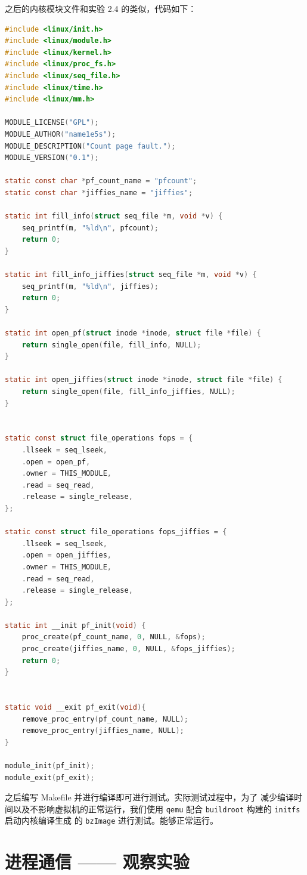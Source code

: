 \documentclass[blue,normal,cn]{elegantnote}
\newcommand{\code}[1]{\colorbox{light-gray}{\texttt{#1}}}
\begin{document}
之后的内核模块文件和实验 2.4 的类似，代码如下：
\begin{lstlisting}[language=C]
#include <linux/init.h>
#include <linux/module.h>
#include <linux/kernel.h>
#include <linux/proc_fs.h>
#include <linux/seq_file.h>
#include <linux/time.h>
#include <linux/mm.h>
 
MODULE_LICENSE("GPL");
MODULE_AUTHOR("name1e5s");
MODULE_DESCRIPTION("Count page fault.");
MODULE_VERSION("0.1");

static const char *pf_count_name = "pfcount";
static const char *jiffies_name = "jiffies";

static int fill_info(struct seq_file *m, void *v) {
    seq_printf(m, "%ld\n", pfcount);
	return 0;
}

static int fill_info_jiffies(struct seq_file *m, void *v) {
    seq_printf(m, "%ld\n", jiffies);
	return 0;
}

static int open_pf(struct inode *inode, struct file *file) {
	return single_open(file, fill_info, NULL);
}

static int open_jiffies(struct inode *inode, struct file *file) {
	return single_open(file, fill_info_jiffies, NULL);
}


static const struct file_operations fops = {
	.llseek = seq_lseek,
	.open = open_pf,
	.owner = THIS_MODULE,
	.read = seq_read,
	.release = single_release,
};

static const struct file_operations fops_jiffies = {
	.llseek = seq_lseek,
	.open = open_jiffies,
	.owner = THIS_MODULE,
	.read = seq_read,
	.release = single_release,
};

static int __init pf_init(void) {
    proc_create(pf_count_name, 0, NULL, &fops);
    proc_create(jiffies_name, 0, NULL, &fops_jiffies);
    return 0;
}


static void __exit pf_exit(void){
    remove_proc_entry(pf_count_name, NULL);
    remove_proc_entry(jiffies_name, NULL);
}

module_init(pf_init);
module_exit(pf_exit);
\end{lstlisting}

之后编写 Makefile 并进行编译即可进行测试。实际测试过程中，为了
减少编译时间以及不影响虚拟机的正常运行，我们使用 \code{qemu} 
配合 \code{buildroot} 构建的 \code{initfs} 启动内核编译生成
的 \code{bzImage} 进行测试。能够正常运行。

\section{进程通信 —— 观察实验}
\end{document}
